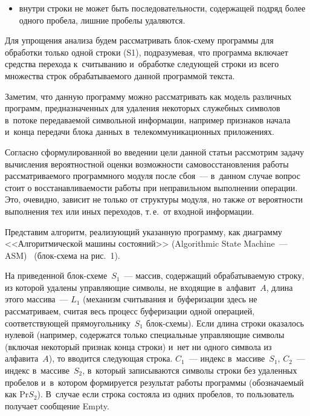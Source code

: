 \begin{multicols}{2}

\begin{itemize}
\item внутри строки не может быть последова\-тель\-ности, содержащей подряд 
более одного пробела, лишние пробелы удаляются. 
\end{itemize}



Для упрощения анализа будем рассматривать блок-схему 
программы для обработки только одной строки (S1), подразумевая, что 
программа включает средства перехода к~считыванию и~обработке следующей 
строки из всего множества строк обрабатываемого данной программой текста.
     
     Заметим, что данную программу можно рассматривать как модель 
различных программ, предназначенных для удаления некоторых служебных 
символов в~потоке передаваемой символьной информации, например 
признаков начала и~конца передачи блока данных в~телекоммуникационных 
приложениях.


     
     Согласно сформулированной во введении цели данной статьи 
рассмотрим задачу вычисления вероятностной оценки возможности 
самовосстановления работы рассматриваемого программного модуля после 
сбоя~--- в~данном случае вопрос стоит о восстанавливаемости работы при 
неправильном выполнении операции. Это, очевидно, зависит не только от 
структуры модуля, но также от вероятности выполнения тех или иных 
переходов, т.\,е.\ от входной информации.
     
     Представим алгоритм, реализующий указанную программу, как 
диаграмму <<Алгоритмической машины состояний>> (Algorithmic State 
Machine~--- ASM)~\cite{8-fr} (блок-схе\-ма на рис.~1). 



     На приведенной блок-схеме~$S_1$~--- массив, содержащий 
обрабатываемую строку, из которой удалены управляющие символы, не 
входящие в~алфавит~$A$, длина этого массива~--- $L_1$ (механизм 
считывания и~буферизации здесь не рассматриваем, считая весь процесс 
буферизации одной операцией, соответствующей прямоугольнику~$S_1$  
блок-схе\-мы). Если длина строки оказалось нулевой (например, содержатся 
только специальные управляющие символы (включая некоторый признак 
конца строки) и~нет ни одного символа из алфавита~$A$), то вводится 
следующая строка. $C_1$~--- индекс в~массиве~$S_1$, $C_2$~--- индекс 
в~массиве~$S_2$, в~который записываются символы строки без удаленных 
пробелов и~в~котором формируется результат работы программы 
(обозначаемый как Pr$S_2$). В~случае если строка состояла из одних пробелов, 
то пользователь получает сообщение Empty. 
     

\end{multicols}
